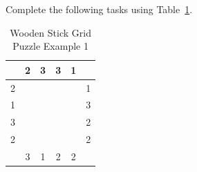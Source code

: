 \documentclass[12pt]{article}
\begin{document}
Complete the following tasks using Table~\ref{tab:wood-stick}.

\begin{table}[ht!]
\centering
\begin{tabular}{c|c|c|c|c|c}
  & 2 & 3 & 3 & 1 &   \\ \hline
2 &   &   &   &   & 1 \\ \hline 
1 &   &   &   &   & 3 \\ \hline 
3 &   &   &   &   & 2 \\ \hline 
2 &   &   &   &   & 2 \\ \hline 
  & 3 & 1 & 2 & 2 &  \\ 
\end{tabular}
\caption{Wooden Stick Grid Puzzle Example 1}
\label{tab:wood-stick}
\end{table}
\end{document}

